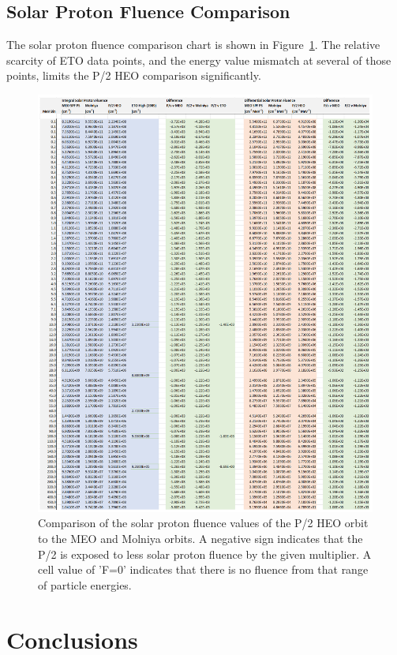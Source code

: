 \documentclass[11pt]{article}
\begin{document}
\subsection{Solar Proton Fluence Comparison}

The solar proton fluence comparison chart is shown in Figure~\ref{fig:COMPSolar}. The relative scarcity of ETO data points, and the energy value mismatch at several of those points, limits the P/2 HEO comparison significantly.

\begin{figure}
    \centering
        \includegraphics[width=1\linewidth]{COMP_Solar.png}
        \caption{Comparison of the solar proton fluence values of the P/2 HEO orbit to the MEO and Molniya orbits. A negative sign indicates that the P/2 is exposed to less solar proton fluence by the given multiplier. A cell value of 'F=0' indicates that there is no fluence from that range of particle energies.}
        \label{fig:COMPSolar}
\end{figure}

\section{Conclusions}
\end{document}
